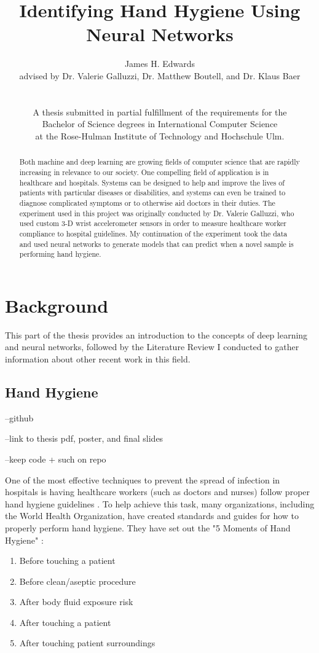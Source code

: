 \documentclass[]{report}
\title{Identifying Hand Hygiene Using Neural Networks}
\author{James H. Edwards \\ advised by Dr. Valerie Galluzzi, Dr. Matthew Boutell, and Dr. Klaus Baer\\
	\\
	\\
	A thesis submitted in partial fulfillment
	of the requirements for the \\
	Bachelor of Science degrees in International Computer Science \\
	 at the Rose-Hulman Institute of Technology and Hochschule Ulm.}
\begin{document}
\maketitle
\tableofcontents



\begin{abstract}
	Both machine and deep learning are growing fields of computer science that are rapidly increasing in relevance to our society. One compelling field of application is in healthcare and hospitals. Systems can be designed to help and improve the lives of patients with particular diseases or disabilities, and systems can even be trained to diagnose complicated symptoms or to otherwise aid doctors in their duties. The experiment used in this project was originally conducted by Dr. Valerie Galluzzi, who used custom 3-D wrist accelerometer sensors in order to measure healthcare worker compliance to hospital guidelines. My continuation of the experiment took the data and used neural networks to generate models that can predict when a novel sample is performing hand hygiene. 
\end{abstract}

\chapter{Background}

This part of the thesis provides an introduction to the concepts of deep learning and neural networks, followed by the Literature Review I conducted to gather information about other recent work in this field.

\section{Hand Hygiene}


--github

--link to thesis pdf, poster, and final slides

--keep code + such on repo


One of the most effective techniques to prevent the spread of infection in hospitals is having healthcare workers (such as doctors and nurses) follow proper hand hygiene guidelines \cite{Galluzzi}. To help achieve this task, many organizations, including the World Health Organization, have created standards and guides for how to properly perform hand hygiene. They have set out the "5 Moments of Hand Hygiene" \cite{WHO}:
\begin{enumerate}
	\item Before touching a patient
	\item Before clean/aseptic procedure
	\item After body fluid exposure risk
	\item After touching a patient
	\item After touching patient surroundings
\end{enumerate}
\end{document}

